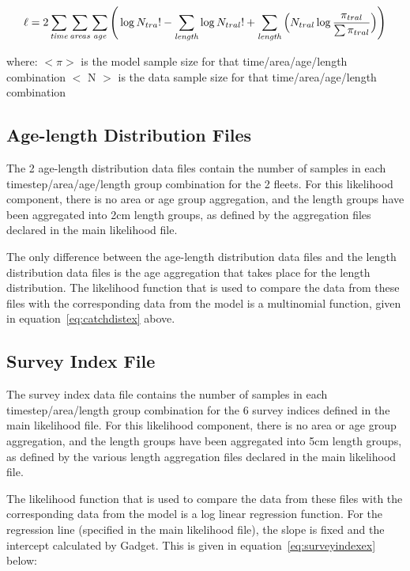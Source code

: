 \documentclass[10pt,twoside]{article}
\begin{document}
\begin{equation}\label{eq:catchdistex}
\ell = 2 \sum_{\it time}\sum_{\it areas}\sum_{\it age} \Bigg( \log N_{tra}! - \sum_{\it length} \log N_{tral}! + \sum_{\it length} \Big( N_{tral} \log {\frac{\pi_{tral}}{\sum \pi_{tral}}} \Big)\Bigg)
\end{equation}

where:\newline
$<\pi>$ is the model sample size for that time/area/age/length combination\newline
$<$ N $>$ is the data sample size for that time/area/age/length combination

{\small }
{\small }

\subsection{Age-length Distribution Files}
The 2 age-length distribution data files contain the number of samples in each timestep/area/age/length group combination for the 2 fleets.  For this likelihood component, there is no area or age group aggregation, and the length groups have been aggregated into 2cm length groups, as defined by the aggregation files declared in the main likelihood file.

\bigskip
The only difference between the age-length distribution data files and the length distribution data files is the age aggregation that takes place for the length distribution.  The likelihood function that is used to compare the data from these files with the corresponding data from the model is a multinomial function, given in equation~\ref{eq:catchdistex} above.

{\small }
{\small }

\subsection{Survey Index File}
The survey index data file contains the number of samples in each timestep/area/length group combination for the 6 survey indices defined in the main likelihood file.  For this likelihood component, there is no area or age group aggregation, and the length groups have been aggregated into 5cm length groups, as defined by the various length aggregation files declared in the main likelihood file.

\bigskip
The likelihood function that is used to compare the data from these files with the corresponding data from the model is a log linear regression function.  For the regression line (specified in the main likelihood file), the slope is fixed and the intercept calculated by Gadget.  This is given in equation~\ref{eq:surveyindexex} below:
\end{document}
